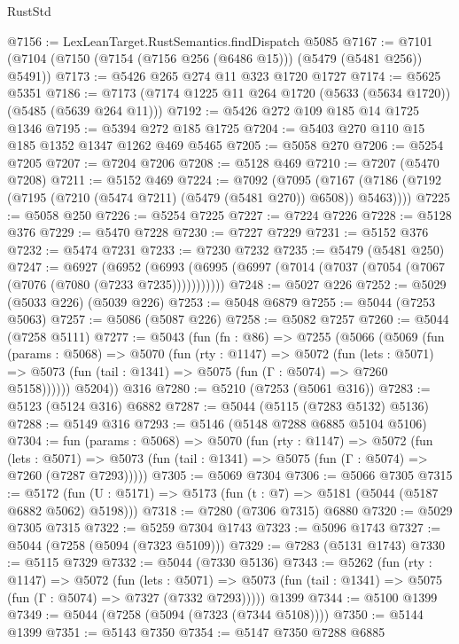 \begin{lexlean}{RustStd}
\begin{coremodule}
@7156 := LexLeanTarget.RustSemantics.findDispatch @5085
@7167 := @7101 (@7104 (@7150 (@7154 (@7156 @256 (@6486 @15))) (@5479 (@5481 @256)) @5491))
@7173 := @5426 @265 @274 @11 @323 @1720 @1727
@7174 := @5625 @5351
@7186 := @7173 (@7174 @1225 @11 @264 @1720 (@5633 (@5634 @1720)) (@5485 (@5639 @264 @11)))
@7192 := @5426 @272 @109 @185 @14 @1725 @1346
@7195 := @5394 @272 @185 @1725
@7204 := @5403 @270 @110 @15 @185 @1352 @1347 @1262 @469 @5465
@7205 := @5058 @270
@7206 := @5254 @7205
@7207 := @7204 @7206
@7208 := @5128 @469
@7210 := @7207 (@5470 @7208)
@7211 := @5152 @469
@7224 := @7092
    (@7095 (@7167 (@7186 (@7192 (@7195 (@7210 (@5474 @7211) (@5479 (@5481 @270)) @6508)) @5463))))
@7225 := @5058 @250
@7226 := @5254 @7225
@7227 := @7224 @7226
@7228 := @5128 @376
@7229 := @5470 @7228
@7230 := @7227 @7229
@7231 := @5152 @376
@7232 := @5474 @7231
@7233 := @7230 @7232
@7235 := @5479 (@5481 @250)
@7247 := @6927
    (@6952 (@6993 (@6995 (@6997 (@7014 (@7037 (@7054 (@7067 (@7076 (@7080 (@7233 @7235)))))))))))
@7248 := @5027 @226
@7252 := @5029 (@5033 @226) (@5039 @226)
@7253 := @5048 @6879
@7255 := @5044 (@7253 @5063)
@7257 := @5086 (@5087 @226)
@7258 := @5082 @7257
@7260 := @5044 (@7258 @5111)
@7277 := @5043
    (fun (fn : @86) =>
    @7255
      (@5066
        (@5069
          (fun (params : @5068) =>
          @5070
            (fun (rty : @1147) =>
            @5072
              (fun (lets : @5071) =>
              @5073 (fun (tail : @1341) => @5075 (fun (Γ : @5074) => @7260 @5158))))))
        @5204))
    @316
@7280 := @5210 (@7253 (@5061 @316))
@7283 := @5123 (@5124 @316) @6882
@7287 := @5044 (@5115 (@7283 @5132) @5136)
@7288 := @5149 @316
@7293 := @5146 (@5148 @7288 @6885 @5104 @5106)
@7304 := fun (params : @5068) =>
  @5070
    (fun (rty : @1147) =>
    @5072
      (fun (lets : @5071) =>
      @5073 (fun (tail : @1341) => @5075 (fun (Γ : @5074) => @7260 (@7287 @7293)))))
@7305 := @5069 @7304
@7306 := @5066 @7305
@7315 := @5172 (fun (U : @5171) => @5173 (fun (t : @7) => @5181 (@5044 (@5187 @6882 @5062) @5198)))
@7318 := @7280 (@7306 @7315) @6880
@7320 := @5029 @7305 @7315
@7322 := @5259 @7304 @1743
@7323 := @5096 @1743
@7327 := @5044 (@7258 (@5094 (@7323 @5109)))
@7329 := @7283 (@5131 @1743)
@7330 := @5115 @7329
@7332 := @5044 (@7330 @5136)
@7343 := @5262
    (fun (rty : @1147) =>
    @5072
      (fun (lets : @5071) =>
      @5073 (fun (tail : @1341) => @5075 (fun (Γ : @5074) => @7327 (@7332 @7293)))))
    @1399
@7344 := @5100 @1399
@7349 := @5044 (@7258 (@5094 (@7323 (@7344 @5108))))
@7350 := @5144 @1399
@7351 := @5143 @7350
@7354 := @5147 @7350 @7288 @6885

\end{coremodule}
\end{lexlean}
